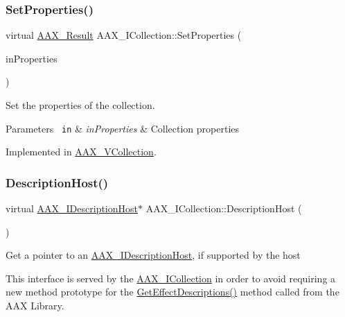 \subsubsection{\texorpdfstring{SetProperties()}{SetProperties()}}
{\footnotesize\ttfamily virtual \mbox{\hyperlink{a00392_a4d8f69a697df7f70c3a8e9b8ee130d2f}{A\+A\+X\+\_\+\+Result}} A\+A\+X\+\_\+\+I\+Collection\+::\+Set\+Properties (\begin{DoxyParamCaption}\item[{\mbox{\hyperlink{a01869}{A\+A\+X\+\_\+\+I\+Property\+Map}} $\ast$}]{in\+Properties }\end{DoxyParamCaption})\hspace{0.3cm}{\ttfamily [pure virtual]}}



Set the properties of the collection. 


\begin{DoxyParams}[1]{Parameters}
\mbox{\texttt{ in}}  & {\em in\+Properties} & Collection properties \\
\hline
\end{DoxyParams}


Implemented in \mbox{\hyperlink{a01897_a08afb5e984bac10864366e0f356ff687}{A\+A\+X\+\_\+\+V\+Collection}}.

\mbox{\label{a01777_aeed6374265a6c9b4c59f752644feba02}} 
\subsubsection{\texorpdfstring{DescriptionHost()}{DescriptionHost()}\hspace{0.1cm}{\footnotesize\ttfamily [1/2]}}
{\footnotesize\ttfamily virtual \mbox{\hyperlink{a01793}{A\+A\+X\+\_\+\+I\+Description\+Host}}$\ast$ A\+A\+X\+\_\+\+I\+Collection\+::\+Description\+Host (\begin{DoxyParamCaption}{ }\end{DoxyParamCaption})\hspace{0.3cm}{\ttfamily [pure virtual]}}

Get a pointer to an \mbox{\hyperlink{a01793}{A\+A\+X\+\_\+\+I\+Description\+Host}}, if supported by the host

This interface is served by the \mbox{\hyperlink{a01777}{A\+A\+X\+\_\+\+I\+Collection}} in order to avoid requiring a new method prototype for the \mbox{\hyperlink{a00796_gae0d356eef326f77cbb972e48946d4892}{Get\+Effect\+Descriptions()}} method called from the A\+AX Library.

